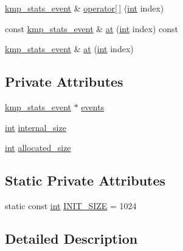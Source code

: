 \begin{DoxyCompactItemize}
\item 
\hyperlink{classkmp__stats__event}{kmp\-\_\-stats\-\_\-event} \& \hyperlink{classkmp__stats__event__vector_a22d8cf0f6b565b4e4f70786dbeb0831f}{operator\mbox{[}$\,$\mbox{]}} (\hyperlink{ittnotify__static_8h_a8b8dcd723308a8cb5d84277c7a3fff70}{int} index)
\item 
const \hyperlink{classkmp__stats__event}{kmp\-\_\-stats\-\_\-event} \& \hyperlink{classkmp__stats__event__vector_af84362f749c87ea521b127b8ee6283ae}{at} (\hyperlink{ittnotify__static_8h_a8b8dcd723308a8cb5d84277c7a3fff70}{int} index) const 
\item 
\hyperlink{classkmp__stats__event}{kmp\-\_\-stats\-\_\-event} \& \hyperlink{classkmp__stats__event__vector_a982111c464e846151178b5dffca32176}{at} (\hyperlink{ittnotify__static_8h_a8b8dcd723308a8cb5d84277c7a3fff70}{int} index)
\end{DoxyCompactItemize}
\subsection*{Private Attributes}
\begin{DoxyCompactItemize}
\item 
\hyperlink{classkmp__stats__event}{kmp\-\_\-stats\-\_\-event} $\ast$ \hyperlink{classkmp__stats__event__vector_aaae9f631d4d74f138fc6d2aa57ed9ed6}{events}
\item 
\hyperlink{ittnotify__static_8h_a8b8dcd723308a8cb5d84277c7a3fff70}{int} \hyperlink{classkmp__stats__event__vector_ab81d47b204c28205c304661fadc92009}{internal\-\_\-size}
\item 
\hyperlink{ittnotify__static_8h_a8b8dcd723308a8cb5d84277c7a3fff70}{int} \hyperlink{classkmp__stats__event__vector_a5afeb1aa530bc09efb9edbff32bc203c}{allocated\-\_\-size}
\end{DoxyCompactItemize}
\subsection*{Static Private Attributes}
\begin{DoxyCompactItemize}
\item 
static const \hyperlink{ittnotify__static_8h_a8b8dcd723308a8cb5d84277c7a3fff70}{int} \hyperlink{classkmp__stats__event__vector_a2bf0b8c1003e5ef544127e00fe7280db}{I\-N\-I\-T\-\_\-\-S\-I\-Z\-E} = 1024
\end{DoxyCompactItemize}


\subsection{Detailed Description}


